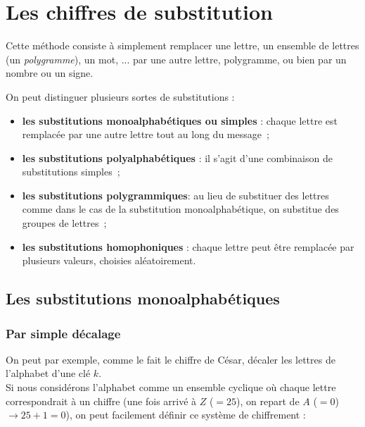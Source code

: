 \section{Les chiffres de substitution}
Cette méthode consiste à simplement remplacer une lettre, un ensemble
de lettres (un \emph{polygramme}), un mot, ...  par une autre lettre,
polygramme, ou bien par un nombre ou un signe.

On peut distinguer plusieurs sortes de substitutions : 
\begin{itemize}
  \item {\sffamily\textbf{les substitutions monoalphabétiques ou simples}} : 
    chaque lettre est remplacée par une autre lettre tout au long du message~; 
  \item {\sffamily\textbf{les substitutions polyalphabétiques}} :
    il s'agit d'une combinaison de substitutions simples~;
  \item {\sffamily\textbf{les substitutions polygrammiques}}: 
    au lieu de substituer des lettres comme dans le cas de la substitution
    monoalphabétique, on substitue des groupes de lettres~;
  \item {\sffamily\textbf{les substitutions homophoniques}} : 
    chaque lettre peut être remplacée par plusieurs valeurs, choisies
    aléatoirement.
\end{itemize}

\subsection{Les substitutions monoalphabétiques}

\subsubsection{Par simple décalage}
On peut par exemple, comme le fait le chiffre de
César, décaler les lettres de l'alphabet d'une
clé $k$. \\

 Si nous considérons l'alphabet comme un ensemble cyclique où 
chaque lettre correspondrait à un chiffre (une fois arrivé à $Z$ ($= 25$), on 
repart de $A$ ($= 0$) $\rightarrow 25 + 1 = 0$), on peut facilement définir 
ce système de chiffrement :  \\


